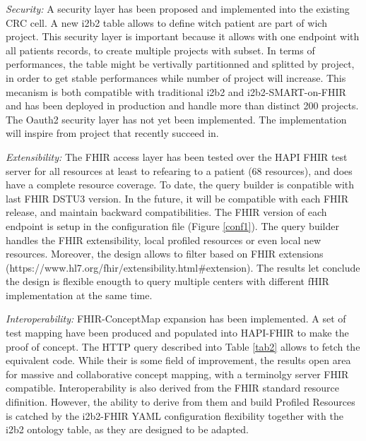 \documentclass{amia}
\begin{document}
\textit{Security: }A security layer has been proposed and implemented into the existing CRC cell. A new i2b2 table allows to define witch patient are part of wich project. This security layer is important because it allows with one endpoint with all patients records, to create multiple projects with subset. In terms of performances, the table might be vertivally partitionned and splitted by project, in order to get stable performances while number of project will increase. This mecanism is both compatible with traditional i2b2 and i2b2-SMART-on-FHIR and has been deployed in production and handle more than distinct 200 projects.
The Oauth2 security layer has not yet been implemented. The implementation will inspire from project\cite{ref2,ref3} that recently succeed in.

\textit{Extensibility:} The FHIR access layer has been tested over the HAPI FHIR test server for all resources at least to refearing to a patient (68 resources), and does have a complete resource coverage. To date, the query builder is conpatible with last FHIR DSTU3 version. In the future, it will be compatible with each FHIR release, and maintain backward compatibilities. The FHIR version of each endpoint is setup in the configuration file (Figure \ref{conf1}). The query builder handles the FHIR extensibility, local profiled resources or even local new resources. Moreover, the design allows to filter based on FHIR extensions (https://www.hl7.org/fhir/extensibility.html\#extension). The results let conclude the design is flexible enougth to query multiple centers with different fHIR implementation at the same time.

\textit{Interoperability: }FHIR-ConceptMap expansion has been implemented. A set of test mapping have been produced and populated into HAPI-FHIR to make the proof of concept. The HTTP query described into Table \ref{tab2} allows to fetch the equivalent code. While their is some field of improvement, the results open area for massive and collaborative concept mapping, with a terminolgy server FHIR compatible. 
Interoperability is also derived from the FHIR standard resource difinition. However, the ability to derive from them and build Profiled Resources is catched by the i2b2-FHIR YAML configuration flexibility together with the i2b2 ontology table, as they are designed to be adapted.
\end{document}
